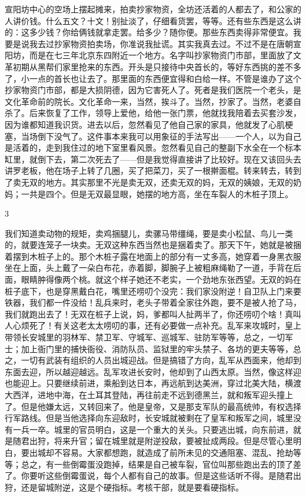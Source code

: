 宣阳坊中心的空场上摆起摊来，拍卖抄家物资，全坊还活着的人都去了，和公家的人讲价钱。什么五文？十文！别扯淡了，仔细看货罢，等等。还有些东西是这么讲的：这多少钱？你给俩钱就拿走罢。给多少？随你便。那些东西卖得非常便宜。我要是说我去过抄家物资拍卖场，你准说我扯谎。其实我真去过。不过不是在唐朝宣阳坊，而是在七三年北京东四附近一个地方。名字叫抄家物资门市部，里面放了文革初期从黑帮们家里抢来的东西。开头是只接待中央首长的，等好东西挑的差不多了，小一点的首长也让去了。那里面的东西便宜得和白给一样。不管是谁办了这个抄家物资门市部，都是大损阴德，因为它害死人了。死者是我们医院一个老头，是文化革命前的院长。文化革命一来，当然，挨斗了。当然，抄家了。当然，老婆自杀了。后来恢复了工作，领导上爱他，给他一张门票，他就找我陪着去买套沙发，因为谁都知道我识货。进去以后，忽然看见了他自己家的家具，他就发了心肌梗塞，当场倒下没气了。这件事本来我可以用象征的手法写出——一个人，以为自己是活着的，走到我住过的地下室里看风景。忽然看见自己的整副下水全在一个标本缸里，就倒下去，第二次死去了——但是我觉得直接讲了比较好。现在又该回头去讲罗老板，他在场子上转了几圈，买了把菜刀，买了一根擀面棍。转来转去，转到了卖无双的地方。其实那里不光是卖无双，还卖无双的妈，无双的姨娘，无双的奶妈；一共是四个。但是无双最显眼，她摆的地方高，坐在车裂人的木桩子顶上。 

3 

我们知道卖动物的规矩，卖鸡捆腿儿，卖骡马带缰绳，要是卖小松鼠、鸟儿一类的，就要连笼子一块卖。无双这种东西当然也是捆着卖了。那天下午，她就是被捆着摆到木桩子上的。那个木桩子露在地面上的部分有一丈多高，她穿着一身黑衣服坐在上面，头上戴了一朵白布花，赤着脚，脚腕子上被粗麻绳勒了一道，手背在后面，眼睛肿得像两个桃。就这个样子她还不老实，一个劲地东张西望。无双的妈在桩子底下，也是穿黑戴白花，嘴里还唠叨个没完：我们家没附逆！自卫队上门来要铁器，我们都一件没给！乱兵来时，老头子带着全家往外跑，要不是被人抢了马，我们就跑出去了！无双在桩子上说，妈，爹都叫人扯两半了，你还唠叨个啥！真叫人心烦死了！有关这老太太唠叨的事，还有必要做一点补充。乱军来攻城时，皇上带领长安城里的羽林军、禁卫军、守城军、巡城军、驻防军等等，总之，一切军士；加上衙门里的捕快衙役、消防队员、监狱里的牢头禁子、各坊的更夫等等，总之，一切有武装有组织的人员出城迎战。但是搞错了方向，乱军从西面来，他却到东面去迎，所以越迎越远。乱军攻进长安时，他却到了山西太原。当然，像这样迎也能迎上。只要继续前进，乘船到达日本，再远航到达美洲，穿过北美大陆，横渡大西洋，进地中海，在土耳其登陆，再往前走不远到德黑兰，就和叛军迎头撞上了。但是他嫌太远，又转回来了。他是皇帝，又是那支军队的最高统帅，有权选择行军路线。但是当他选择向东迎敌时，长安城就被剩在了皇军和叛军之间，城里没有一兵一卒。城里的官员明白，这是一个重大的关头。只要逃出城，向东前进，就是随君出狩，将来升官；留在城里就是附逆投敌，要被扯成两段。但是尽管心里明白，要出城却不容易。大家都想跑，就造成了前所未见的交通阻塞、混乱、抢劫等等；总之，有一些倒霉蛋没跑掉，结果是自己被车裂，官位叫那些跑出去的顶了差了。你要听这些倒霉蛋说，每个人都有自己的故事。但是这些话听不得。是随君出狩，还是留城附逆，这是个硬指标。考核干部，就是要看硬指标。 

